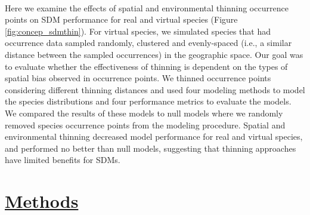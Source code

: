  

\paragraph*{}
Here we examine the effects of spatial and environmental thinning occurrence points on SDM performance for real and virtual species (Figure \ref{fig:concep_sdmthin}). For virtual species, we simulated species that had occurrence data sampled randomly, clustered and evenly-spaced (i.e., a similar distance between the sampled occurrences) in the geographic space. Our goal was to evaluate whether the effectiveness of thinning is dependent on the types of spatial bias observed in occurrence points. We thinned occurrence points considering different thinning distances and used four modeling methods to model the species distributions and four performance metrics to evaluate the models. We compared the results of these models to null models where we randomly removed species occurrence points from the modeling procedure. Spatial and environmental thinning decreased model performance for real and virtual species, and performed no better than null models, suggesting that thinning approaches have limited benefits for SDMs.

\section*{\textbf{\underline{Methods}}}


